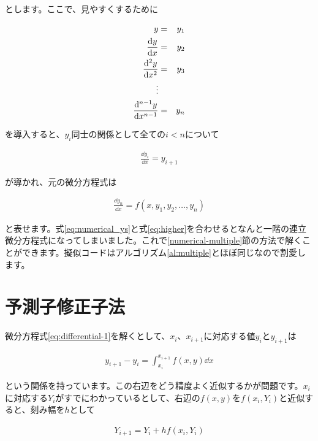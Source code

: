 \noindent
とします。ここで、見やすくするために

\begin{eqnarray}
    y&=&y_1 \nonumber \\
    \frac{\dd y}{\dd x}&=&y_2 \nonumber \\
    \frac{\dd^2 y}{\dd x^2}&=&y_3 \nonumber \\
    \vdots \nonumber \\
    \frac{\dd^{n-1} y}{\dd x^{n-1}}&=&y_n \setcounter{equation}{35}
\end{eqnarray}

\noindent
を導入すると、$y_i$同士の関係として全ての$i<n$について

\begin{eqnarray}
    \frac{\dd y_i}{\dd x}=y_{i+1}
    \label{eq:numerical_ys}
\end{eqnarray}

\noindent
が導かれ、元の微分方程式は

\begin{eqnarray}
    \frac{\dd y_n}{\dd x}=f(x,y_1,y_2,\dots,y_n)
    \label{eq:higher}
\end{eqnarray}

\noindent
と表せます。式\ref{eq:numerical_ys}と式\ref{eq:higher}を合わせるとなんと一階の連立微分方程式になってしまいました。これで\ref{numerical-multiple}節の方法で解くことができます。擬似コードはアルゴリズム\ref{al:multiple}とほぼ同じなので割愛します。








\section{予測子修正子法}
\label{numerical-integrate}
微分方程式\ref{eq:differential-1}を解くとして、$x_i$、$x_{i+1}$に対応する値$y_i$と$y_{i+1}$は

\begin{eqnarray}
    y_{i+1}-y_i=\int_{x_i}^{x_{i+1}}f(x,y)\dd x
    \label{eq:numerical-integrate}
\end{eqnarray}

\noindent
という関係を持っています。この右辺をどう精度よく近似するかが問題です。$x_i$に対応する$Y_i$がすでにわかっているとして、右辺の$f(x,y)$を$f(x_i,Y_i)$と近似すると、刻み幅を$h$として

\begin{eqnarray}
    Y_{i+1}=Y_i+hf(x_i,Y_i) \nonumber
\end{eqnarray}

